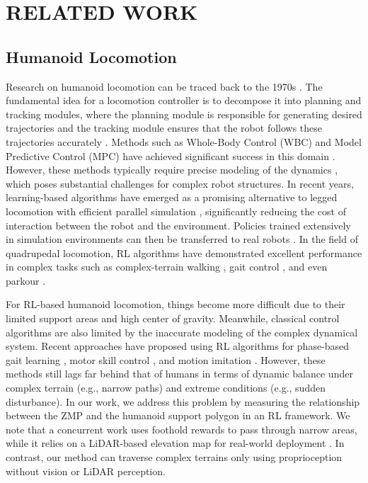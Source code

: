 \section{RELATED WORK}
\subsection{Humanoid Locomotion}

Research on humanoid locomotion can be traced back to the 1970s \cite{Kato1974InformationPower}. The fundamental idea for a locomotion controller is to decompose it into planning and tracking modules, where the planning module is responsible for generating desired trajectories and the tracking module ensures that the robot follows these trajectories accurately \cite{grandia2023perceptive,meduri2023biconmp}. Methods such as Whole-Body Control (WBC) and Model Predictive Control (MPC) have achieved significant success in this domain \cite{li2023multi,sentis2006whole,sleiman2021unified}. However, these methods typically require precise modeling of the dynamics \cite{koenemann2015whole,schultz2009modeling}, which poses substantial challenges for complex robot structures. In recent years, learning-based algorithms have emerged as a promising alternative to legged locomotion \cite{HumanGym1,ha2024learning} with efficient parallel simulation \cite{Learning-to-walk}, significantly reducing the cost of interaction between the robot and the environment. Policies trained extensively in simulation environments can then be transferred to real robots \cite{he2024bridging}. In the field of quadrupedal locomotion, RL algorithms have demonstrated excellent performance in complex tasks such as complex-terrain walking \cite{levy2024learning,shi2024robust}, gait control \cite{han2024lifelike,huang2024diffuseloco}, and even parkour \cite{zhuang2023robot,cheng2024extreme}. 

For RL-based humanoid locomotion, things become more difficult due to their limited support areas and high center of gravity. Meanwhile, classical control algorithms are also limited by the inaccurate modeling of the complex dynamical system. Recent approaches have proposed using RL algorithms for phase-based gait learning \cite{HumanGym2,HugWBC}, motor skill control \cite{decentralized,hilo}, and motion imitation \cite{AMP,embrace}. However, these methods still lags far behind that of humans in terms of dynamic balance under complex terrain (e.g., narrow paths) and extreme conditions (e.g., sudden disturbance). In our work, we address this problem by measuring the relationship between the ZMP and the humanoid support polygon in an RL framework. 
We note that a concurrent work uses foothold rewards to pass through narrow areas, while it relies on a LiDAR-based elevation map for real-world deployment \cite{wang2024beamdojo}. In contrast, our method can traverse complex terrains only using proprioception without vision or LiDAR perception.


